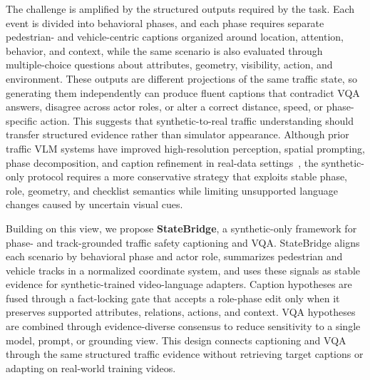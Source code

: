 \documentclass[runningheads]{llncs}
\begin{document}
The challenge is amplified by the structured outputs required by the task. Each event is divided into behavioral phases, and each phase requires separate pedestrian- and vehicle-centric captions organized around location, attention, behavior, and context, while the same scenario is also evaluated through multiple-choice questions about attributes, geometry, visibility, action, and environment. These outputs are different projections of the same traffic state, so generating them independently can produce fluent captions that contradict VQA answers, disagree across actor roles, or alter a correct distance, speed, or phase-specific action. This suggests that synthetic-to-real traffic understanding should transfer structured evidence rather than simulator appearance. Although prior traffic VLM systems have improved high-resolution perception, spatial prompting, phase decomposition, and caption refinement in real-data settings~\cite{pervaiz2025trafficvila,wu2025trafficinternvl,phimsiri2025trafficinternvl,nguyennhu2025ster}, the synthetic-only protocol requires a more conservative strategy that exploits stable phase, role, geometry, and checklist semantics while limiting unsupported language changes caused by uncertain visual cues.

Building on this view, we propose \textbf{StateBridge}, a synthetic-only framework for phase- and track-grounded traffic safety captioning and VQA. StateBridge aligns each scenario by behavioral phase and actor role, summarizes pedestrian and vehicle tracks in a normalized coordinate system, and uses these signals as stable evidence for synthetic-trained video-language adapters. Caption hypotheses are fused through a fact-locking gate that accepts a role-phase edit only when it preserves supported attributes, relations, actions, and context. VQA hypotheses are combined through evidence-diverse consensus to reduce sensitivity to a single model, prompt, or grounding view. This design connects captioning and VQA through the same structured traffic evidence without retrieving target captions or adapting on real-world training videos.
\end{document}
